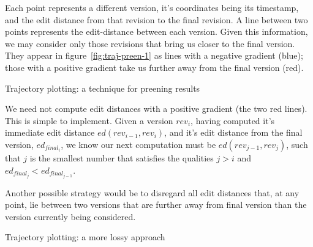 Each point represents a different version, it's coordinates being its
timestamp, and the edit distance from that revision to the final
revision. A line between two points represents the edit-distance
between each version. Given this information, we may consider only
those revisions that bring us closer to the final version. They appear
in figure~\ref{fig:traj-preen-1} as lines with a negative gradient
(blue); those with a positive gradient take us further away from the
final version (red).

\begin{floatingfigure}[p]{0.4\textwidth}
  \centering
  \pgfplotsset{width=0.4\textwidth}
  \caption{Trajectory plotting: a technique for preening results}
  \label{fig:traj-preen-1}
\end{floatingfigure}

We need not compute edit distances with a positive gradient (the two
red lines). This is simple to implement. Given a version $rev_i$, having
computed it's immediate edit distance $ed(rev_{i-1},rev_i)$, and it's edit
distance from the final version, $ed_{final_i}$, we know our next
computation must be $ed(rev_{j-1},rev_j)$, such that $j$ is the smallest
number that satisfies the qualities $j > i$ and $ed_{final_j} <
ed_{final_{j-1}}$.

Another possible strategy would be to disregard all edit distances
that, at any point, lie between two versions that are further away
from final version than the version currently being considered.

\begin{floatingfigure}[p]{0.4\textwidth}
  \centering
  \pgfplotsset{width=0.4\textwidth}
  \caption{Trajectory plotting: a more lossy approach}
  \label{fig:traj-preen-2}
\end{floatingfigure}

